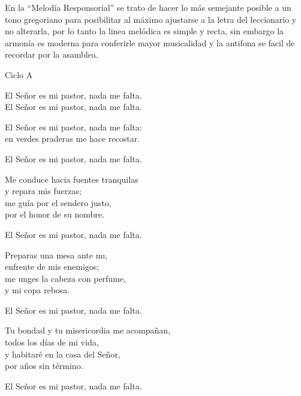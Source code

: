 \documentclass[12pt, letterpaper]{report}
\begin{document}
    \Large En la ``Melod\'ia Responsorial'' se trato de hacer lo m\'as semejante posible a un tono gregoriano para posibilitar al m\'aximo ajustarse a la letra del leccionario y no alterarla, por lo tanto la linea mel\'odica es simple y recta, sin embargo la armon\'ia es moderna para conferirle mayor musicalidad y la antifona se facil de recordar por la asamblea.

    \begin{center}
        \LARGE Ciclo A
    \end{center}

    \noindent
    \LARGE El Se\~nor es mi pastor, nada me falta.\\
    El Se\~nor es mi pastor, nada me falta.

    \noindent
    El Se\~nor es mi pastor, nada me falta:\\
    en verdes praderas me hace recostar.

    \noindent
    El Se\~nor es mi pastor, nada me falta.

    \noindent
    Me conduce hacia fuentes tranquilas\\
    y repara mis fuerzas;\\
    me gu\'ia por el sendero justo,\\
    por el honor de su nombre.

    \noindent
    El Se\~nor es mi pastor, nada me falta.

    \noindent
    Preparas una mesa ante m\i,\\
    enfrente de mis enemigos;\\
    me unges la cabeza con perfume,\\
    y mi copa rebosa.

    \noindent
    El Se\~nor es mi pastor, nada me falta.

    \noindent
    Tu bondad y tu misericordia me acompa\~nan,\\
    todos los d\'ias de mi vida,\\
    y habitar\'e en la casa del Se\~nor,\\
    por a\~nos sin t\'ermino.

    \noindent
    El Se\~nor es mi pastor, nada me falta.
    \clearpage


\end{document}
